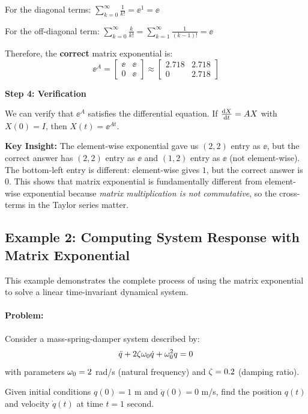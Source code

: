 \documentclass[11pt,a4paper]{article}
\begin{document}
For the diagonal terms: $\sum_{k=0}^{\infty} \frac{1}{k!} = \ee^1 = \ee$

For the off-diagonal term: $\sum_{k=0}^{\infty} \frac{k}{k!} = \sum_{k=1}^{\infty} \frac{1}{(k-1)!} = \ee$

Therefore, the \textbf{correct} matrix exponential is:
\begin{equation}
	\ee^A = \begin{bmatrix} \ee & \ee \\ 0 & \ee \end{bmatrix} \approx \begin{bmatrix} 2.718 & 2.718 \\ 0 & 2.718 \end{bmatrix}
\end{equation}

\textbf{Step 4: Verification}

We can verify that $\ee^A$ satisfies the differential equation. If $\frac{\mathrm{d} X}{\mathrm{d} t} = AX$ with $X(0) = I$, then $X(t) = \ee^{At}$.

\textbf{Key Insight:} The element-wise exponential gave us $(2,2)$ entry as $\ee$, but the correct answer has $(2,2)$ entry as $\ee$ and $(1,2)$ entry as $\ee$ (not element-wise). The bottom-left entry is different: element-wise gives $1$, but the correct answer is $0$. This shows that matrix exponential is fundamentally different from element-wise exponential because \emph{matrix multiplication is not commutative}, so the cross-terms in the Taylor series matter.


\subsection{Example 2: Computing System Response with Matrix Exponential}

This example demonstrates the complete process of using the matrix exponential to solve a linear time-invariant dynamical system.

\paragraph{Problem:}
Consider a mass-spring-damper system described by:
\begin{equation}
	\ddot{q} + 2\zeta\omega_0\dot{q} + \omega_0^2 q = 0
\end{equation}
with parameters $\omega_0 = 2$ rad/s (natural frequency) and $\zeta = 0.2$ (damping ratio).

Given initial conditions $q(0) = 1$ m and $\dot{q}(0) = 0$ m/s, find the position $q(t)$ and velocity $\dot{q}(t)$ at time $t = 1$ second.
\end{document}
